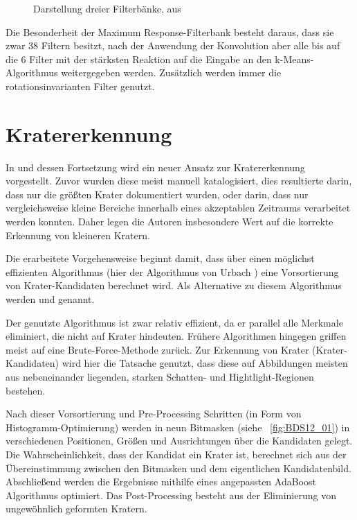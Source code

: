 \begin{figure}[h!]
\begin{subfigure}[t]{0.21\textwidth}
	\end{subfigure}
	\caption{Darstellung dreier Filterbänke, aus \cite{visgeo}}
	\label{fig:filterbank}
\end{figure}

Die Besonderheit der Maximum Response-Filterbank besteht daraus, dass sie zwar 38 Filtern besitzt, nach der Anwendung der Konvolution aber alle bis auf die 6 Filter mit der stärksten Reaktion auf die Eingabe an den k-Means-Algorithmus weitergegeben werden. Zusätzlich werden immer die rotationsinvarianten Filter genutzt.

\section{Kratererkennung}
\label{sec:craterdetection}

In \cite{bandeira_10} und dessen Fortsetzung \cite{bandeira_12} wird ein neuer Ansatz zur Kratererkennung vorgestellt. Zuvor wurden diese meist manuell katalogisiert, dies resultierte darin, dass nur die größten Krater dokumentiert wurden, oder darin, dass nur vergleichsweise kleine Bereiche innerhalb eines akzeptablen Zeitraums verarbeitet werden konnten. Daher legen die Autoren insbesondere Wert auf die korrekte Erkennung von kleineren Kratern.

Die erarbeitete Vorgehensweise beginnt damit, dass über einen möglichst effizienten Algorithmus (hier der Algorithmus von Urbach \etal \cite{urbach_stepinski_2009}) eine Vorsortierung von Krater-Kandidaten berechnet wird. Als Alternative zu diesem Algorithmus werden \cite{bandeira_07} und \cite{salamuniccar_10} genannt.

Der genutzte Algorithmus ist zwar relativ effizient, da er parallel alle Merkmale eliminiert, die nicht auf Krater hindeuten. Frühere Algorithmen hingegen griffen meist auf eine Brute-Force-Methode zurück. Zur Erkennung von Krater (\bzw Krater-Kandidaten) wird hier die Tatsache genutzt, dass diese auf Abbildungen meisten aus nebeneinander liegenden, starken Schatten- und Hightlight-Regionen bestehen.

Nach dieser Vorsortierung und Pre-Processing Schritten (in Form von Histogramm-Optimierung) werden in \cite{bandeira_10, bandeira_12} neun Bitmasken (siehe \figurename~\ref{fig:BDS12_01}) in verschiedenen Positionen, Größen und Ausrichtungen über die Kandidaten gelegt. Die Wahrscheinlichkeit, dass der Kandidat ein Krater ist, berechnet sich aus der Übereinstimmung zwischen den Bitmasken und dem eigentlichen Kandidatenbild. Abschließend werden die Ergebnisse mithilfe eines angepassten AdaBoost Algorithmus optimiert. Das Post-Processing besteht aus der Eliminierung von ungewöhnlich geformten Kratern.

